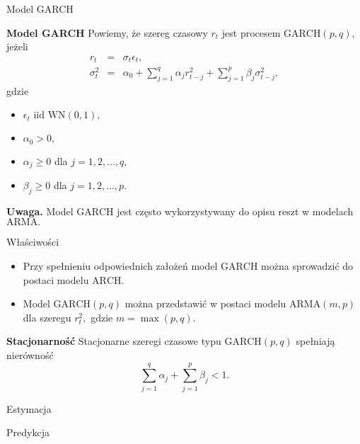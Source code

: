 \documentclass[a4paper, 11pt]{beamer}
\begin{document}
	\begin{frame}{Model GARCH}
		\begin{block}{\textbf{Model GARCH}}
			Powiemy, że szereg czasowy $r_t$ jest procesem $\mbox{GARCH}\left(p,q\right),$ jeżeli \begin{eqnarray*}
				r_t & = & \sigma_t \epsilon_t,\\
				\sigma^2_t & = & \alpha_0 + \sum_{j=1}^{q} \alpha_j r_{t-j}^2 + \sum_{j=1}^{p} \beta_j \sigma_{t-j}^2,
			\end{eqnarray*} gdzie
			\begin{itemize}
				\item $\epsilon_t \mbox{ iid } \mbox{WN}\left(0, 1\right),$
				\item $\alpha_0 > 0,$
				\item $\alpha_j \geq 0$ dla $j=1,2,\ldots,q,$
				\item $\beta_j \geq 0$ dla $j=1,2,\ldots,p.$
			\end{itemize}
		\end{block}
		\begin{alert}{\textbf{Uwaga.}}
			Model $\mbox{GARCH}$ jest często wykorzystywany do opisu reszt w modelach $\mbox{ARMA}.$
		\end{alert}
	\end{frame}
	
	\begin{frame}{Właściwości}
		\begin{itemize}
			\item Przy spełnieniu odpowiednich założeń model $\mbox{GARCH}$ można sprowadzić
				do postaci modelu $\mbox{ARCH}.$
			\item Model $\mbox{GARCH}\left(p,q\right)$ można przedstawić w postaci modelu
				$\mbox{ARMA}\left(m,p\right)$ dla szeregu $r_t^2,$ gdzie $m=\max\left(p,q\right).$
		\end{itemize}
		\begin{block}{\textbf{Stacjonarność}}
			Stacjonarne szeregi czasowe typu $\mbox{GARCH}\left(p,q\right)$ spełniają nierówność \[
				\sum_{j=1}^{q} \alpha_j + \sum_{j=1}^{p} \beta_j < 1.
			\]
		\end{block}
	\end{frame}
	
	\begin{frame}{Estymacja}
	\end{frame}
	
	\begin{frame}{Predykcja}
	\end{frame}
	
\end{document}
